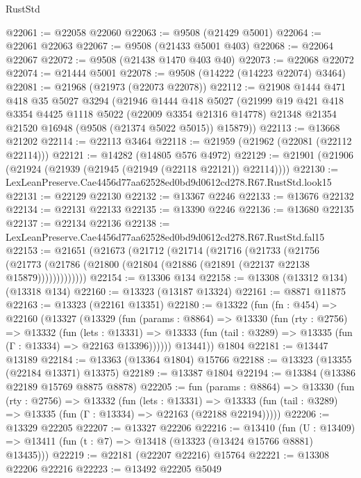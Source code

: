 \begin{lexlean}{RustStd}
\begin{coremodule}
@22061 := @22058 @22060
@22063 := @9508 (@21429 @5001)
@22064 := @22061 @22063
@22067 := @9508 (@21433 @5001 @403)
@22068 := @22064 @22067
@22072 := @9508 (@21438 @1470 @403 @40)
@22073 := @22068 @22072
@22074 := @21444 @5001
@22078 := @9508 (@14222 (@14223 @22074) @3464)
@22081 := @21968 (@21973 (@22073 @22078))
@22112 := @21908
    @1444
    @471
    @418
    @35
    @5027
    @3294
    (@21946
      @1444
      @418
      @5027
      (@21999
        @19
        @421
        @418
        @3354
        @4425
        @1118
        @5022
        (@22009 @3354 @21316 @14778)
        @21348
        @21354
        @21520
        @16948
        (@9508 (@21374 @5022 @5015))
        @15879))
@22113 := @13668 @21202
@22114 := @22113 @3464
@22118 := @21959 (@21962 (@22081 (@22112 @22114)))
@22121 := @14282 (@14805 @576 @4972)
@22129 := @21901 (@21906 (@21924 (@21939 (@21945 (@21949 (@22118 @22121)) @22114))))
@22130 := LexLeanPreserve.Cae4456d77aa62528ed0bd9d0612cd278.R67.RustStd.look15
@22131 := @22129 @22130
@22132 := @13367 @2246
@22133 := @13676 @22132
@22134 := @22131 @22133
@22135 := @13390 @2246
@22136 := @13680 @22135
@22137 := @22134 @22136
@22138 := LexLeanPreserve.Cae4456d77aa62528ed0bd9d0612cd278.R67.RustStd.fal15
@22153 := @21651
    (@21673
      (@21712
        (@21714
          (@21716
            (@21733
              (@21756
                (@21773 (@21786 (@21800 (@21804 (@21886 (@21891 (@22137 @22138 @15879)))))))))))))
@22154 := @13306 @134
@22158 := @13308 (@13312 @134) (@13318 @134)
@22160 := @13323 (@13187 @13324)
@22161 := @8871 @11875
@22163 := @13323 (@22161 @13351)
@22180 := @13322
    (fun (fn : @454) =>
    @22160
      (@13327
        (@13329
          (fun (params : @8864) =>
          @13330
            (fun (rty : @2756) =>
            @13332
              (fun (lets : @13331) =>
              @13333 (fun (tail : @3289) => @13335 (fun (Γ : @13334) => @22163 @13396))))))
        @13441))
    @1804
@22181 := @13447 @13189
@22184 := @13363 (@13364 @1804) @15766
@22188 := @13323 (@13355 (@22184 @13371) @13375)
@22189 := @13387 @1804
@22194 := @13384 (@13386 @22189 @15769 @8875 @8878)
@22205 := fun (params : @8864) =>
  @13330
    (fun (rty : @2756) =>
    @13332
      (fun (lets : @13331) =>
      @13333 (fun (tail : @3289) => @13335 (fun (Γ : @13334) => @22163 (@22188 @22194)))))
@22206 := @13329 @22205
@22207 := @13327 @22206
@22216 := @13410
    (fun (U : @13409) => @13411 (fun (t : @7) => @13418 (@13323 (@13424 @15766 @8881) @13435)))
@22219 := @22181 (@22207 @22216) @15764
@22221 := @13308 @22206 @22216
@22223 := @13492 @22205 @5049

\end{coremodule}
\end{lexlean}
